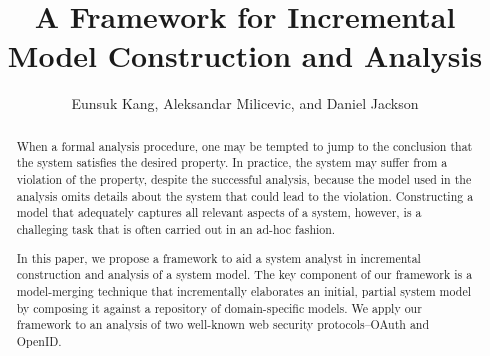\documentclass{llncs}
\def\mytitle{A Framework for Incremental Model Construction and Analysis}
\begin{document}
\title{\mytitle}
%
%
\author{Eunsuk Kang, Aleksandar Milicevic, and Daniel Jackson}
%

\maketitle              %

\begin{abstract}
  When a formal analysis procedure, one may be tempted to jump to
  the conclusion that the system satisfies the desired property. In
  practice, the system may suffer from a violation of the property,
  despite the successful analysis, because the model used in the
  analysis omits details about the system that could lead to the
  violation. Constructing a model that adequately captures all
  relevant aspects of a system, however, is a challeging task that is
  often carried out in an ad-hoc fashion.

  In this paper, we propose a framework to aid a system analyst in
  incremental construction and analysis of a system model. The key
  component of our framework is a model-merging technique that
  incrementally elaborates an initial, partial system model by
  composing it against a repository of domain-specific models. We
  apply our framework to an analysis of two well-known web security
  protocols--OAuth and OpenID.
\end{abstract}










%
%
%





%


\end{document}
